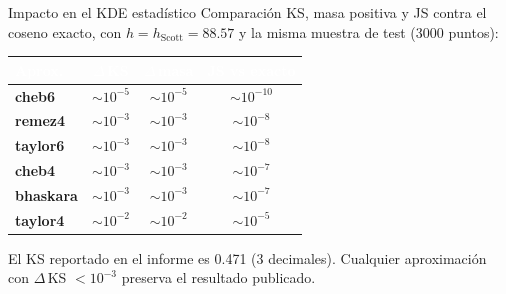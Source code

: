 \documentclass[aspectratio=169,10pt]{beamer}
\begin{document}
\begin{frame}{Impacto en el KDE estadístico}
  \footnotesize
  Comparación KS, masa positiva y JS contra el coseno exacto, con
  $h=h_{\text{Scott}}=88.57$ y la misma muestra de test (3000 puntos):

  \centering
  \renewcommand{\arraystretch}{1.25}
  \begin{tabular}{>{\bfseries}l c c c}
    \toprule
    \rowcolor{Navy}
    \textcolor{white}{Aprox.} &
    \textcolor{white}{$\Delta\,$KS} &
    \textcolor{white}{$\Delta\,$masa} &
    \textcolor{white}{JS vs exacto} \\
    \midrule
    \rowcolor{LTeal}  cheb6    & $\sim 10^{-5}$     & $\sim 10^{-5}$     & $\sim 10^{-10}$ \\
    \rowcolor{LPurple} remez4  & $\sim 10^{-3}$     & $\sim 10^{-3}$     & $\sim 10^{-8}$  \\
    \rowcolor{LAmber!40} taylor6 & $\sim 10^{-3}$   & $\sim 10^{-3}$     & $\sim 10^{-8}$  \\
    \rowcolor{LPurple} cheb4   & $\sim 10^{-3}$     & $\sim 10^{-3}$     & $\sim 10^{-7}$  \\
    \rowcolor{LCoral} bhaskara  & $\sim 10^{-3}$   & $\sim 10^{-3}$     & $\sim 10^{-7}$  \\
    \rowcolor{LAmber!40} taylor4 & $\sim 10^{-2}$   & $\sim 10^{-2}$     & $\sim 10^{-5}$  \\
    \bottomrule
  \end{tabular}
  \vspace{4pt}

  \begin{tcolorbox}[colback=LGreen, colframe=Green, fontupper=\footnotesize]
    El KS reportado en el informe es 0.471 (3 decimales). Cualquier
    aproximación con $\Delta\,$KS $< 10^{-3}$ preserva el resultado
    publicado.
  \end{tcolorbox}
\end{frame}
\end{document}
